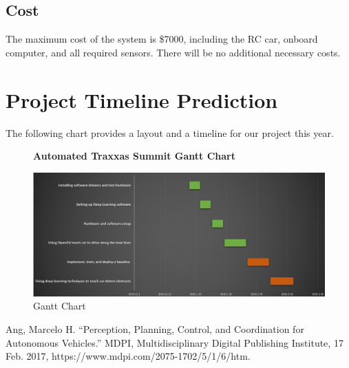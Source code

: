 \documentclass[onecolumn, draftclsnofoot,10pt]{IEEEtran}
\begin{document}
\bigskip

\subsection{Cost}
The maximum cost of the system is \$7000, including the RC car, onboard computer, and all required sensors. There will be no additional necessary costs.


\section{Project Timeline Prediction}
The following chart provides a layout and a timeline for our project this year.
\begin{figure}[H]
  \centering
   \textbf{Automated Traxxas Summit Gantt Chart}\par\medskip
    \includegraphics[width=\linewidth]{gantt.png}
    \caption{Gantt Chart}
\end{figure}

\bigskip
\bigskip
\bigskip

\begin{thebibliography}{99}

Ang, Marcelo H. “Perception, Planning, Control, and Coordination for Autonomous Vehicles.” MDPI, Multidisciplinary Digital Publishing Institute, 17 Feb. 2017, https://www.mdpi.com/2075-1702/5/1/6/htm.

\end{thebibliography}
\end{document}
